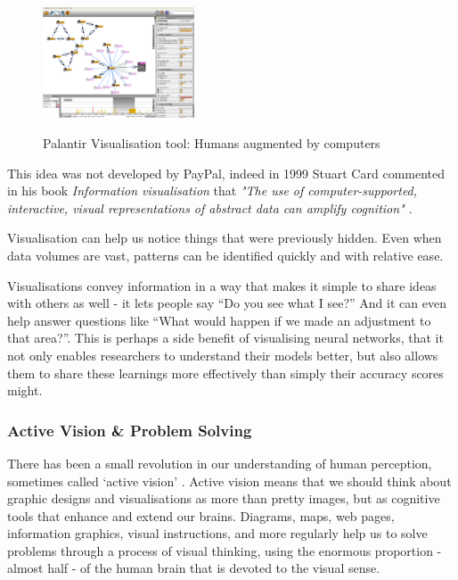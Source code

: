 \documentclass[a4paper,11pt,titlepage]{article}
\begin{document}
		\begin{figure}[H]
    			\centering	
			{{\includegraphics[width=0.4\textwidth]
    				{img/palantir_01.png} 
    			}}%
    			\caption{Palantir Visualisation tool: Humans augmented by computers}%
    		\label{fig:Palantir}
		\end{figure}

This idea was not developed by PayPal, indeed in 1999 Stuart Card commented in his book \textit{Information visualisation} that \textit{"The use of computer-supported, interactive, visual representations of abstract data can amplify cognition" \cite{card1999}}.
\par 
Visualisation can help us notice things that were previously hidden. Even when data volumes are vast, patterns can be identified quickly and with relative ease.
\par 
Visualisations convey information in a way that makes it simple to share ideas with others as well -  it lets people say ``Do you see what I see?” And it can even help answer questions like ``What would happen if we made an adjustment to that area?”. This is perhaps a side benefit of visualising neural networks, that it not only enables researchers to understand their models better, but also allows them to share these learnings more effectively than simply their accuracy scores might.

\subsubsection{Active Vision \& Problem Solving}
 	There has been a small revolution in our understanding of human perception, sometimes called `active vision' \cite{Ware2010}. Active vision means that we should think about graphic designs and visualisations as more than pretty images, but as cognitive tools that enhance and extend our brains. Diagrams, maps, web pages, information graphics, visual instructions, and more regularly help us to solve problems through a process of visual thinking, using the enormous proportion - almost half - of the human brain that is devoted to the visual sense.  
 		
\end{document}
